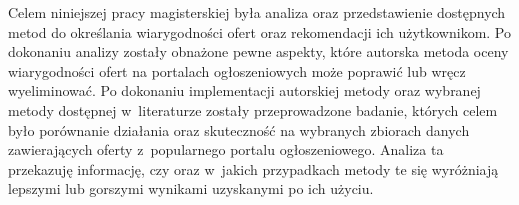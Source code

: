 \documentclass[../Kamil_Kowalewski_Main.tex]{subfiles}
\begin{document}
 {
    Celem niniejszej pracy magisterskiej była analiza oraz przedstawienie dostępnych
    metod do określania wiarygodności ofert oraz rekomendacji ich użytkownikom. Po
    dokonaniu analizy zostały obnażone pewne aspekty, które autorska metoda oceny
    wiarygodności ofert na portalach ogłoszeniowych może poprawić lub wręcz
    wyeliminować. Po dokonaniu implementacji autorskiej metody oraz wybranej metody
    dostępnej w~literaturze zostały przeprowadzone badanie, których celem było
    porównanie działania oraz skuteczność na wybranych zbiorach danych zawierających
    oferty z~popularnego portalu ogłoszeniowego. Analiza ta przekazuję informację, czy
    oraz w~jakich przypadkach metody te się wyróżniają lepszymi lub gorszymi wynikami
    uzyskanymi po ich użyciu.
}
\end{document}
